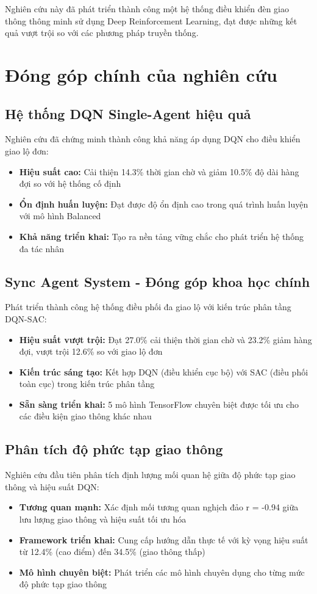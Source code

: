 Nghiên cứu này đã phát triển thành công một hệ thống điều khiển đèn giao thông thông minh sử dụng Deep Reinforcement Learning, đạt được những kết quả vượt trội so với các phương pháp truyền thống.

\section{Đóng góp chính của nghiên cứu}

\subsection{Hệ thống DQN Single-Agent hiệu quả}
Nghiên cứu đã chứng minh thành công khả năng áp dụng DQN cho điều khiển giao lộ đơn:
\begin{itemize}
    \item \textbf{Hiệu suất cao:} Cải thiện 14.3\% thời gian chờ và giảm 10.5\% độ dài hàng đợi so với hệ thống cố định
    \item \textbf{Ổn định huấn luyện:} Đạt được độ ổn định cao trong quá trình huấn luyện với mô hình Balanced
    \item \textbf{Khả năng triển khai:} Tạo ra nền tảng vững chắc cho phát triển hệ thống đa tác nhân
\end{itemize}

\subsection{Sync Agent System - Đóng góp khoa học chính}
Phát triển thành công hệ thống điều phối đa giao lộ với kiến trúc phân tầng DQN-SAC:
\begin{itemize}
    \item \textbf{Hiệu suất vượt trội:} Đạt 27.0\% cải thiện thời gian chờ và 23.2\% giảm hàng đợi, vượt trội 12.6\% so với giao lộ đơn
    \item \textbf{Kiến trúc sáng tạo:} Kết hợp DQN (điều khiển cục bộ) với SAC (điều phối toàn cục) trong kiến trúc phân tầng
    \item \textbf{Sẵn sàng triển khai:} 5 mô hình TensorFlow chuyên biệt được tối ưu cho các điều kiện giao thông khác nhau
\end{itemize}

\subsection{Phân tích độ phức tạp giao thông}
Nghiên cứu đầu tiên phân tích định lượng mối quan hệ giữa độ phức tạp giao thông và hiệu suất DQN:
\begin{itemize}
    \item \textbf{Tương quan mạnh:} Xác định mối tương quan nghịch đảo r = -0.94 giữa lưu lượng giao thông và hiệu suất tối ưu hóa
    \item \textbf{Framework triển khai:} Cung cấp hướng dẫn thực tế với kỳ vọng hiệu suất từ 12.4\% (cao điểm) đến 34.5\% (giao thông thấp)
    \item \textbf{Mô hình chuyên biệt:} Phát triển các mô hình chuyên dụng cho từng mức độ phức tạp giao thông
\end{itemize}



